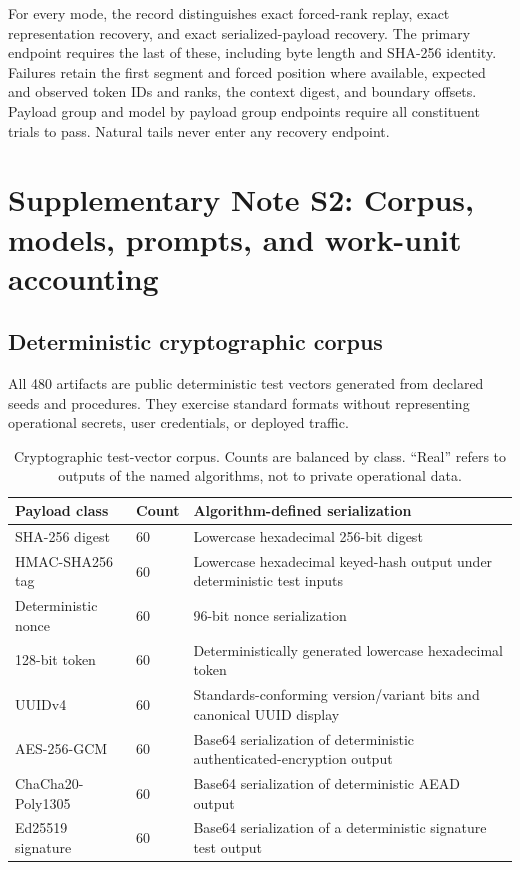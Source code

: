 \documentclass[fleqn,10pt]{wlscirep}
\providecommand{\DIFaddend}{} %
\DeclareRobustCommand{\DIFaddend}{\DIFOaddend \let\includegraphics\DIFOincludegraphics} %
\begin{document}
\DIFaddend For every mode, the record distinguishes exact forced-rank replay, exact representation recovery, and exact serialized-payload recovery. The primary endpoint requires the last of these, including byte length and SHA-256 identity. Failures retain the first segment and forced position where available, expected and observed token IDs and ranks, the context digest, and boundary offsets. Payload group and model by payload group endpoints require all constituent trials to pass. Natural tails never enter any recovery endpoint.

\section*{Supplementary Note S2: Corpus, models, prompts, and work-unit accounting}\label{si:s2}

\subsection*{Deterministic cryptographic corpus}

All 480 artifacts are public deterministic test vectors generated from declared seeds and procedures. They exercise standard formats without representing operational secrets, user credentials, or deployed traffic.

\begin{table}[H]
\centering
\small
\begin{tabularx}{\textwidth}{L{0.23\textwidth}L{0.13\textwidth}Y}
\toprule
Payload class & Count & Algorithm-defined serialization \\
\midrule
SHA-256 digest & 60 & Lowercase hexadecimal 256-bit digest \\
HMAC-SHA256 tag & 60 & Lowercase hexadecimal keyed-hash output under deterministic test inputs \\
Deterministic nonce & 60 & 96-bit nonce serialization \\
128-bit token & 60 & Deterministically generated lowercase hexadecimal token \\
UUIDv4 & 60 & Standards-conforming version/variant bits and canonical UUID display \\
AES-256-GCM & 60 & Base64 serialization of deterministic authenticated-encryption output \\
ChaCha20-Poly1305 & 60 & Base64 serialization of deterministic AEAD output \\
Ed25519 signature & 60 & Base64 serialization of a deterministic signature test output \\
\bottomrule
\end{tabularx}
\caption{\label{tab:payloads}Cryptographic test-vector corpus. Counts are balanced by class. “Real” refers to outputs of the named algorithms, not to private operational data.}
\end{table}
\end{document}
